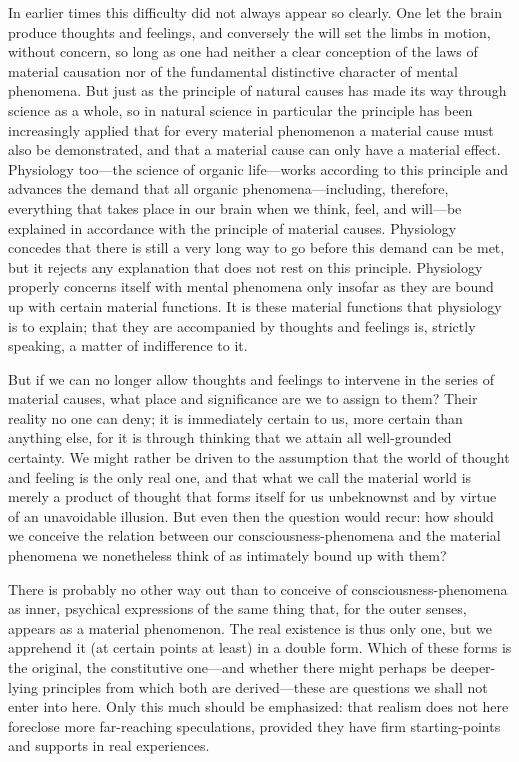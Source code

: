 \documentclass[12pt,a4paper]{article}
\newcommand{\opage}[1]{\marginnote{\footnotesize\textit{[#1]}}}
\begin{document}
In earlier times this difficulty did not always appear so clearly. One
let the brain produce thoughts and feelings, and conversely the will set
the limbs in motion, without concern, so long as one had neither a clear
conception of the laws of material causation nor of the fundamental
distinctive character of mental phenomena. But just as the principle of
natural causes has made its way through science as a whole, so in natural
science in particular the principle has been increasingly applied that for
every material phenomenon a material cause must also be demonstrated, and
that a material cause can only have a material effect. Physiology too---the
science of organic life---works according to this principle and advances
the demand that all organic phenomena---including, therefore, everything
that takes place in our brain when we think, feel, and will---be explained
in accordance with the principle of material causes. Physiology concedes
that there is still a very long way to go before this demand can be met,
but it rejects any explanation that does not rest on this principle.
Physiology properly concerns itself with mental phenomena only insofar as
they are bound up with certain material functions. It is these material
functions that physiology is to explain; that they are accompanied by
thoughts and feelings is, strictly speaking, a matter of indifference
to it.

But if we can no longer allow thoughts and feelings to intervene in the
series of material causes, what place and significance are we to assign
to them? Their reality no one can deny; it is immediately certain to us,
more certain than \opage{9}anything else, for it is through thinking that we attain
all well-grounded certainty. We might rather be driven to the assumption
that the world of thought and feeling is the only real one, and that what
we call the material world is merely a product of thought that forms
itself for us unbeknownst and by virtue of an unavoidable illusion. But
even then the question would recur: how should we conceive the relation
between our consciousness-phenomena and the material phenomena we
nonetheless think of as intimately bound up with them?

There is probably no other way out than to conceive of
consciousness-phenomena as inner, psychical expressions of the same thing
that, for the outer senses, appears as a material phenomenon. The real
existence is thus only one, but we apprehend it (at certain points at
least) in a double form. Which of these forms is the original, the
constitutive one---and whether there might perhaps be deeper-lying
principles from which both are derived---these are questions we shall not
enter into here. Only this much should be emphasized: that realism does
not here foreclose more far-reaching speculations, provided they have firm
starting-points and supports in real experiences.
\end{document}
